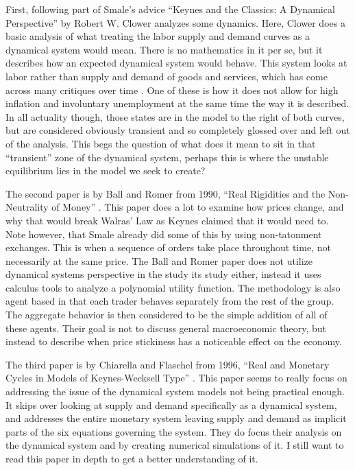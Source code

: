 \documentclass{article}
\begin{document}
First, following part of Smale's advice ``Keynes and the Classics: A Dynamical Perspective'' by Robert W. Clower \cite{clower_keynes_1960} analyzes some dynamics. Here, Clower does a basic analysis of what treating the labor supply and demand curves as a dynamical system would mean. There is no mathematics in it per se, but it describes how an expected dynamical system would behave. This system looks at labor rather than supply and demand of goods and services, which has come across many critiques over time \cite{mankiw_quick_1990}. One of these is how it does not allow for high inflation and involuntary unemployment at the same time the way it is described. In all actuality though, those states are in the model to the right of both curves, but are considered obviously transient and so completely glossed over and left out of the analysis. This begs the question of what does it mean to sit in that ``transient'' zone of the dynamical system, perhaps this is where the unstable equilibrium lies in the model we seek to create?

The second paper is by Ball and Romer from 1990, ``Real Rigidities and the Non-Neutrality of Money'' \cite{ball_real_1990}. This paper does a lot to examine how prices change, and why that would break Walras' Law as Keynes claimed that it would need to. Note however, that Smale already did some of this \cite{smale_exchange_1976} by using non-tatonment exchanges. This is when a sequence of orders take place throughout time, not necessarily at the same price. The Ball and Romer paper does not utilize dynamical systems perspective in the study its study either, instead it uses calculus tools to analyze a polynomial utility function. The methodology is also agent based in that each trader behaves separately from the rest of the group. The aggregate behavior is then considered to be the simple addition of all of these agents. Their goal is not to discuss general macroeconomic theory, but instead to describe when price stickiness has a noticeable effect on the economy.

The third paper is by Chiarella and Flaschel from 1996, ``Real and Monetary Cycles in Models of Keynes-Wecksell Type'' \cite{chiarella_real_1996}. This paper seems to really focus on addressing the issue of the dynamical system models not being practical enough. It skips over looking at supply and demand specifically as a dynamical system, and addresses the entire monetary system leaving supply and demand as implicit parts of the six equations governing the system. They do focus their analysis on the dynamical system and by creating numerical simulations of it. I still want to read this paper in depth to get a better understanding of it.
\end{document}

